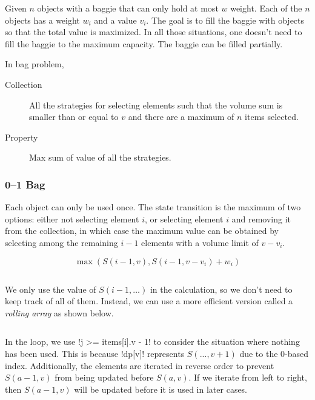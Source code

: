 \documentclass{article}
\begin{document}
Given $n$ objects with a baggie that can only hold at most $w$ weight. Each of the $n$ objects has a weight $w_i$ and a value $v_i$. The goal is to fill the baggie with objects so that the total value is maximized. In all those situations, one doesn't need to fill the baggie to the maximum capacity. The baggie can be filled partially.

In bag problem,

\begin{description}
	\item[Collection] All the strategies for selecting elements such that the volume sum is smaller than or equal to $v$ and there are a maximum of $n$ items selected.
	\item[Property] Max sum of value of all the strategies.
\end{description}

\subsubsection{0--1 Bag}

Each object can only be used once. The state transition is the maximum of two options: either not selecting element $i$, or selecting element $i$ and removing it from the collection, in which case the maximum value can be obtained by selecting among the remaining $i - 1$ elements with a volume limit of $v - v_i$.

\[
	\max(S(i - 1, v), S(i - 1, v - v_i) + w_i)
\]

\begin{center}
	\inputminted[firstline=5]{cpp}{src/struct-0-1-rudimentary-bag.cpp}%
\end{center}

We only use the value of $S(i - 1, \ldots)$ in the calculation, so we don't need to keep track of all of them. Instead, we can use a more efficient version called a \emph{rolling array} as shown below.

\begin{center}
	\inputminted[firstline=5]{cpp}{src/struct-0-1-bag.cpp}
\end{center}

In the loop, we use \mono!j >= items[i].v - 1! to consider the situation where nothing has been used. This is because \mono!dp[v]! represents $S(..., v + 1)$ due to the 0-based index. Additionally, the elements are iterated in reverse order to prevent $S(a-1,v)$ from being updated before $S(a,v)$. If we iterate from left to right, then $S(a-1,v)$ will be updated before it is used in later cases.
\end{document}
